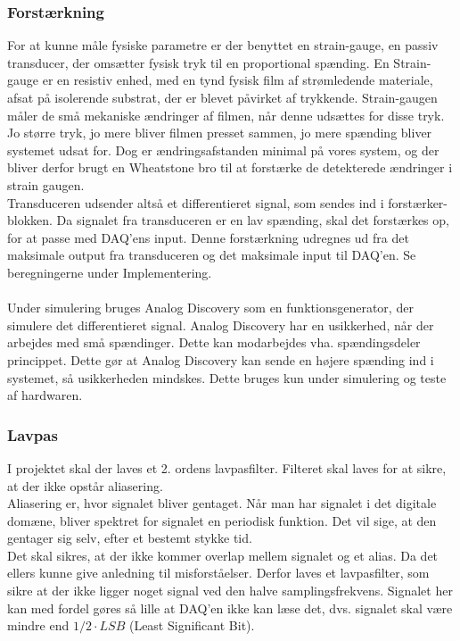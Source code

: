 \subsubsection{Forstærkning}
For at kunne måle fysiske parametre er der benyttet en strain-gauge\cite{Wheatstone}, en passiv transducer, der omsætter fysisk tryk til en proportional spænding. En Strain-gauge er en resistiv enhed, med en tynd fysisk film af strømledende materiale, afsat på isolerende substrat, der er blevet påvirket af trykkende. Strain-gaugen måler de små mekaniske ændringer af filmen, når denne udsættes for disse tryk. Jo større tryk, jo mere bliver filmen presset sammen, jo mere spænding bliver systemet udsat for. Dog er ændringsafstanden minimal på vores system, og der bliver derfor brugt en Wheatstone\cite{Wheatstone} bro til at forstærke de detekterede ændringer i strain gaugen.\\
Transduceren udsender altså et differentieret signal, som sendes ind i forstærker-blokken. Da signalet fra transduceren er en lav spænding, skal det forstærkes op, for at passe med DAQ'ens input. Denne forstærkning udregnes ud fra det maksimale output fra transduceren og det maksimale input til DAQ'en. Se beregningerne under Implementering. \\ 
\\
Under simulering bruges Analog Discovery som en funktionsgenerator, der simulere det differentieret signal. Analog Discovery har en usikkerhed, når der arbejdes med små spændinger. Dette kan modarbejdes vha. spændingsdeler princippet. Dette gør at Analog Discovery kan sende en højere spænding ind i systemet, så usikkerheden mindskes. Dette bruges kun under simulering og teste af hardwaren.   

\subsubsection{Lavpas}
I projektet skal der laves et 2. ordens lavpasfilter. Filteret skal laves for at sikre, at der ikke opstår aliasering.\\
Aliasering \cite{DSB} er, hvor signalet bliver gentaget. Når man har signalet i det digitale domæne, bliver spektret for signalet en periodisk funktion. Det vil sige, at den gentager sig selv, efter et bestemt stykke tid. \\
Det skal sikres, at der ikke kommer overlap mellem signalet og et alias. Da det ellers kunne give anledning til misforståelser. Derfor laves et lavpasfilter, som sikre at der ikke ligger noget signal ved den halve samplingsfrekvens. Signalet her kan med fordel gøres så lille at DAQ'en ikke kan læse det, dvs. signalet skal være mindre end $ 1/2 \cdot LSB $ (Least Significant Bit).    

